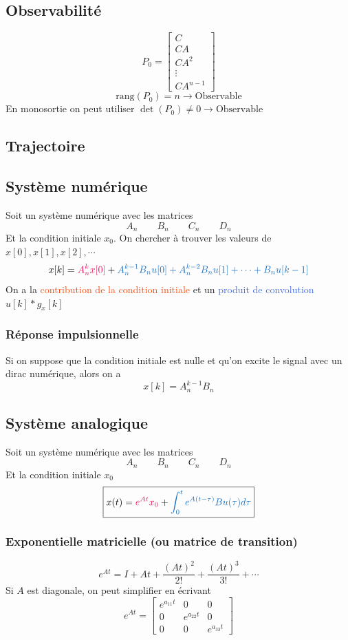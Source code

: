 \documentclass[resume]{subfiles}
\begin{document}
\subsection{Observabilité}
$$\boxed{P_0=\begin{bmatrix}C\\CA\\CA^2\\\vdots\\CA^{n-1}\end{bmatrix}}$$
$$\boxed{\text{rang}(P_0)=n\longrightarrow\text{Observable}}$$
En monosortie on peut utiliser $\det(P_0)\neq 0\longrightarrow \text{Observable}$
\subsection{Trajectoire}
\subsection{Système numérique}
Soit un système numérique avec les matrices
$$A_n\qquad B_n\qquad C_n\qquad D_n$$
Et la condition initiale $x_0$. On chercher à trouver les valeurs de $x[0],x[1],x[2],\cdots$
$$x[k]=\textcolor{OrangeRed}{A_n^kx[0]}+\textcolor{RoyalBlue}{A_n^{k-1}B_nu[0]+A_n^{k-2}B_nu[1]+\cdots +B_nu[k-1]}$$
On a la \textcolor{OrangeRed}{contribution de la condition initiale} et un \textcolor{RoyalBlue}{produit de convolution} $u[k]\ast g_x[k]$
\subsubsection{Réponse impulsionnelle}
Si on suppose que la condition initiale est nulle et qu'on excite le signal avec un dirac numérique, alors on a
$$\boxed{x[k]=A_n^{k-1}B_n}$$
\subsection{Système analogique}
Soit un système numérique avec les matrices
$$A_n\qquad B_n\qquad C_n\qquad D_n$$
Et la condition initiale $x_0$
$$\boxed{x(t)=\textcolor{OrangeRed}{e^{At}x_0}+\textcolor{RoyalBlue}{\int_{0}^{t}e^{A(t-\tau)}Bu(\tau)d\tau}}$$
\subsubsection{Exponentielle matricielle (ou matrice de transition)}
$$\boxed{e^{At}=I+At+\frac{(At)^2}{2!}+\frac{(At)^3}{3!}+\cdots}$$
Si $A$ est diagonale, on peut simplifier en écrivant
$$e^{At}=\begin{bmatrix}e^{a_{11}t} & 0 & 0\\0 & e^{a_{22}t} & 0\\0 & 0 & e^{a_{33}t}\end{bmatrix}$$
\end{document}
